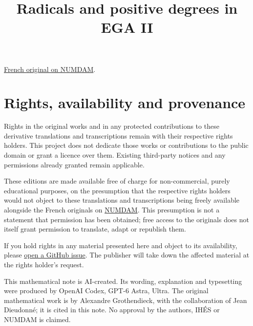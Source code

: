 \documentclass[11pt,a4paper]{article}
\title{Radicals and positive degrees in EGA II}
\author{}
\date{}
\begin{document}
\maketitle

\noindent\href{https://www.numdam.org/item/PMIHÉS_1961__8__5_0/}{French original on NUMDAM}.

\clearpage
\section*{Rights, availability and provenance}
Rights in the original works and in any protected contributions to these derivative translations and transcriptions remain with their respective rights holders. This project does not dedicate those works or contributions to the public domain or grant a licence over them. Existing third-party notices and any permissions already granted remain applicable.

These editions are made available free of charge for non-commercial, purely educational purposes, on the presumption that the respective rights holders would not object to these translations and transcriptions being freely available alongside the French originals on \href{https://www.numdam.org/journals/PMIHÉS/}{NUMDAM}. This presumption is not a statement that permission has been obtained; free access to the originals does not itself grant permission to translate, adapt or republish them.

If you hold rights in any material presented here and object to its availability, please \href{https://github.com/KokunoYumeto/ega-en/issues}{open a GitHub issue}. The publisher will take down the affected material at the rights holder's request.


This mathematical note is AI-created. Its wording, explanation and typesetting were produced by OpenAI Codex, GPT-6 Astra, Ultra. The original mathematical work is by Alexandre Grothendieck, with the collaboration of Jean Dieudonné; it is cited in this note. No approval by the authors, IHÉS or NUMDAM is claimed.
\end{document}
